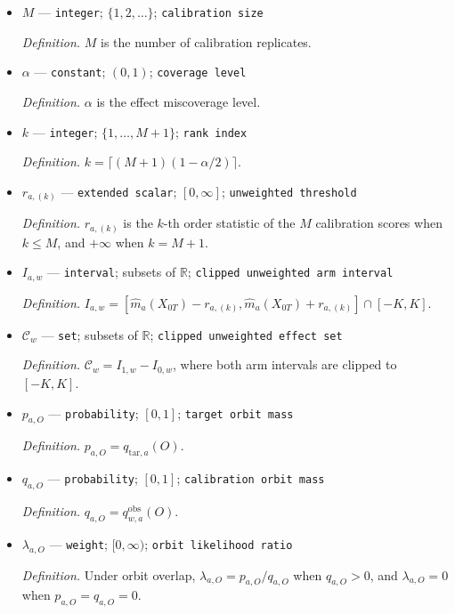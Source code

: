 \documentclass{article}
\begin{document}
\begin{itemize}
  \par\smallskip\noindent\emph{Definition.} \(\Delta_a(w)=\tfrac12\sum_{O\in\mathcal O}|\delta_{a,O}(w)|\).
  \item \(M\) --- \texttt{integer}; \(\{1,2,\ldots\}\); \texttt{calibration size}
  \par\smallskip\noindent\emph{Definition.} \(M\) is the number of calibration replicates.
  \item \(\alpha\) --- \texttt{constant}; \((0,1)\); \texttt{coverage level}
  \par\smallskip\noindent\emph{Definition.} \(\alpha\) is the effect miscoverage level.
  \item \(k\) --- \texttt{integer}; \(\{1,\ldots,M+1\}\); \texttt{rank index}
  \par\smallskip\noindent\emph{Definition.} \(k=\lceil(M+1)(1-\alpha/2)\rceil\).
  \item \(r_{a,(k)}\) --- \texttt{extended scalar}; \([0,\infty]\); \texttt{unweighted threshold}
  \par\smallskip\noindent\emph{Definition.} \(r_{a,(k)}\) is the \(k\)-th order statistic of the \(M\) calibration scores when \(k\le M\), and \(+\infty\) when \(k=M+1\).
  \item \(I_{a,w}\) --- \texttt{interval}; subsets of \(\mathbb R\); \texttt{clipped unweighted arm interval}
  \par\smallskip\noindent\emph{Definition.} \(I_{a,w}=[\widehat m_a(X_{0T})-r_{a,(k)},\widehat m_a(X_{0T})+r_{a,(k)}]\cap[-K,K]\).
  \item \(\mathcal C_w\) --- \texttt{set}; subsets of \(\mathbb R\); \texttt{clipped unweighted effect set}
  \par\smallskip\noindent\emph{Definition.} \(\mathcal C_w=I_{1,w}-I_{0,w}\), where both arm intervals are clipped to \([-K,K]\).
  \item \(p_{a,O}\) --- \texttt{probability}; \([0,1]\); \texttt{target orbit mass}
  \par\smallskip\noindent\emph{Definition.} \(p_{a,O}=q_{\mathrm{tar},a}(O)\).
  \item \(q_{a,O}\) --- \texttt{probability}; \([0,1]\); \texttt{calibration orbit mass}
  \par\smallskip\noindent\emph{Definition.} \(q_{a,O}=q^{\mathrm{obs}}_{w,a}(O)\).
  \item \(\lambda_{a,O}\) --- \texttt{weight}; \([0,\infty)\); \texttt{orbit likelihood ratio}
  \par\smallskip\noindent\emph{Definition.} Under orbit overlap, \(\lambda_{a,O}=p_{a,O}/q_{a,O}\) when \(q_{a,O}>0\), and \(\lambda_{a,O}=0\) when \(p_{a,O}=q_{a,O}=0\).

\end{itemize}
\end{document}
